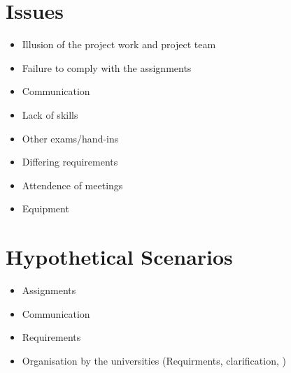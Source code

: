 \section{Issues}

	\begin{itemize}
		\item Illusion of the project work and project team
		\item Failure to comply with the assignments
		\item Communication
		\item Lack of skills
		\item Other exams/hand-ins
		\item Differing requirements
		\item Attendence of meetings
		\item Equipment

	\end{itemize}



\section{Hypothetical Scenarios}

	\begin{itemize}
		\item Assignments
		\item Communication
		\item Requirements
		\item Organisation by the universities (Requirments, clarification, )
	\end{itemize}
